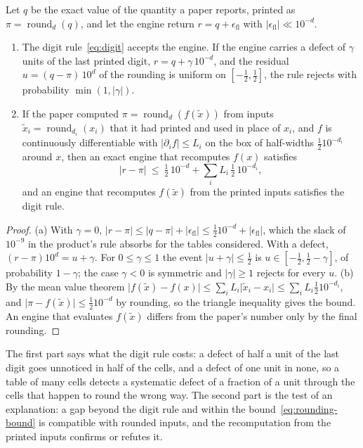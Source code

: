 \begin{proposition}\label{prop:rounding}
Let $q$ be the exact value of the quantity a paper reports, printed as $\pi=\operatorname{round}_d(q)$, and let the engine return $r=q+\epsilon_{\mathrm{fl}}$ with $\lvert\epsilon_{\mathrm{fl}}\rvert\ll 10^{-d}$.
\begin{enumerate}
\item[(a)] The digit rule~\eqref{eq:digit} accepts the engine. If the engine carries a defect of $\gamma$ units of the last printed digit, $r=q+\gamma\,10^{-d}$, and the residual $u=(q-\pi)\,10^{d}$ of the rounding is uniform on $[-\tfrac12,\tfrac12]$, the rule rejects with probability $\min(1,\lvert\gamma\rvert)$.
\item[(b)] If the paper computed $\pi=\operatorname{round}_d(f(\tilde{x}))$ from inputs $\tilde{x}_i=\operatorname{round}_{d_i}(x_i)$ that it had printed and used in place of $x_i$, and $f$ is continuously differentiable with $\lvert\partial_i f\rvert\le L_i$ on the box of half-widths $\tfrac12 10^{-d_i}$ around $x$, then an exact engine that recomputes $f(x)$ satisfies
\begin{equation}
\lvert r-\pi\rvert\ \le\ \tfrac12\,10^{-d}+\sum_i L_i\,\tfrac12\,10^{-d_i},
\label{eq:rounding-bound}
\end{equation}
and an engine that recomputes $f(\tilde{x})$ from the printed inputs satisfies the digit rule.
\end{enumerate}
\end{proposition}
\begin{proof}
(a) With $\gamma=0$, $\lvert r-\pi\rvert\le\lvert q-\pi\rvert+\lvert\epsilon_{\mathrm{fl}}\rvert\le\tfrac12 10^{-d}+\lvert\epsilon_{\mathrm{fl}}\rvert$, which the slack of $10^{-9}$ in the product's rule absorbs for the tables considered. With a defect, $(r-\pi)10^{d}=u+\gamma$. For $0\le\gamma\le1$ the event $\lvert u+\gamma\rvert\le\tfrac12$ is $u\in[-\tfrac12,\tfrac12-\gamma]$, of probability $1-\gamma$; the case $\gamma<0$ is symmetric and $\lvert\gamma\rvert\ge1$ rejects for every $u$. (b) By the mean value theorem $\lvert f(\tilde{x})-f(x)\rvert\le\sum_i L_i\lvert\tilde{x}_i-x_i\rvert\le\sum_i L_i\tfrac12 10^{-d_i}$, and $\lvert\pi-f(\tilde{x})\rvert\le\tfrac12 10^{-d}$ by rounding, so the triangle inequality gives the bound. An engine that evaluates $f(\tilde{x})$ differs from the paper's number only by the final rounding. \qedhere
\end{proof}

The first part says what the digit rule costs: a defect of half a unit of the last digit goes unnoticed in half of the cells, and a defect of one unit in none, so a table of many cells detects a systematic defect of a fraction of a unit through the cells that happen to round the wrong way. The second part is the test of an explanation: a gap beyond the digit rule and within the bound~\eqref{eq:rounding-bound} is compatible with rounded inputs, and the recomputation from the printed inputs confirms or refutes it.

